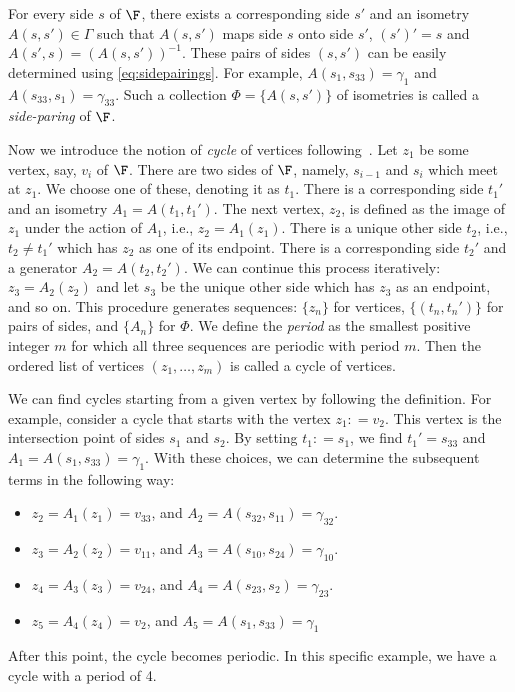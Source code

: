 For every side $s$ of $\F$, there exists a corresponding side $s'$ and an isometry $A(s,s')\in \Gamma$
such that $A(s,s')$ maps side $s$ onto side $s'$, $(s')' = s$ and $A(s', s) = (A(s, s'))^{-1}$.
These pairs of sides $(s,s')$ can be easily determined using \eqref{eq:sidepairings}.
For example, $A(s_1,s_{33}) = \gamma_1$ and $A(s_{33},s_1)=\gamma_{33}$.
Such a collection $\Phi=\{A(s,s')\}$ of isometries is called a \textit{side-paring} of $\F$.

Now we introduce the notion of \textit{cycle} of vertices following~\cite{maskit1971}.
Let $z_1$ be some vertex, say, $v_i$ of $\F$.
There are two sides of $\F$, namely, $s_{i-1}$ and $s_i$ which meet at $z_1$.
We choose one of these, denoting it as $t_1$.
There is a corresponding side $t_1'$ and an isometry $A_1 = A(t_1,t_1')$.
The next vertex, $z_2$, is defined as the image of $z_1$ under the action of $A_1$, i.e., $z_2 = A_1(z_1)$.
There is a unique other side $t_2$, i.e., $t_2\neq t_1'$ which has $z_2$ as one of its endpoint. 
There is a corresponding side $t_2'$ and a generator $A_2 = A(t_2, t_2')$.
We can continue this process iteratively: $z_3 = A_2(z_2)$ and let $s_3$ be the unique other side which has $z_3$ as an endpoint, and so on.
This procedure generates sequences: $\{z_n\}$ for vertices, $\{(t_n, t_n')\}$ for pairs of sides, and $\{A_n\}$ for $\Phi$.
We define the \textit{period} as the smallest positive integer $m$ for which all three sequences are periodic with period $m$.
Then the ordered list of vertices $(z_1, \ldots, z_m)$ is called a cycle of vertices.

We can find cycles starting from a given vertex by following the definition.
For example, consider a cycle that starts with the vertex $z_1: =  v_{2}$.
This vertex is the intersection point of sides $s_1$ and $s_2$.
By setting $t_1: = s_1$, we find $t_1' = s_{33}$ and $A_1 = A(s_1, s_{33})=\gamma_1$.
With these choices, we can determine the subsequent terms in the following way:
\begin{itemize}
    \item \( z_2 = A_1(z_1) = v_{33} \), and \( A_2 = A(s_{32}, s_{11}) = \gamma_{32} \).
    \item \( z_3 = A_2(z_2) = v_{11} \), and \( A_3 = A(s_{10}, s_{24}) = \gamma_{10} \).
    \item \( z_4 = A_3(z_3) = v_{24} \), and \( A_4 = A(s_{23}, s_{2}) = \gamma_{23} \).
    \item \( z_5 = A_4(z_4) = v_{2} \), and \( A_5 = A(s_{1}, s_{33}) = \gamma_{1} \)
\end{itemize}
After this point, the cycle becomes periodic.
In this specific example, we have a cycle with a period of 4.

